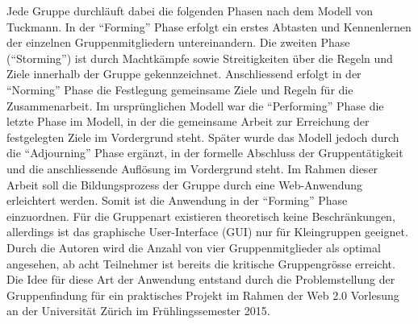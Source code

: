 \newline\newline
Jede Gruppe durchläuft dabei die folgenden Phasen nach dem Modell von Tuckmann.\citep[Vgl.][S.~26-28]{dick_teamwork_2013} In der "`Forming"' Phase erfolgt ein erstes Abtasten und Kennenlernen der einzelnen Gruppenmitgliedern untereinandern. Die zweiten Phase ("`Storming"') ist durch Machtkämpfe sowie Streitigkeiten über die Regeln und Ziele innerhalb der Gruppe gekennzeichnet. Anschliessend erfolgt in der "`Norming"' Phase die Festlegung gemeinsame Ziele und Regeln für die Zusammenarbeit. Im ursprünglichen Modell war die "`Performing"' Phase die letzte Phase im Modell, in der die gemeinsame Arbeit zur Erreichung der festgelegten Ziele im Vordergrund steht. Später wurde das Modell jedoch durch die "`Adjourning"' Phase ergänzt, in der formelle Abschluss der Gruppentätigkeit und die anschliessende Auflösung im Vordergrund steht.
\newline\newline
Im Rahmen dieser Arbeit soll die Bildungsprozess der Gruppe durch eine Web-Anwendung erleichtert werden. Somit ist die Anwendung in der "`Forming"' Phase einzuordnen. Für die Gruppenart existieren theoretisch keine Beschränkungen, allerdings ist das graphische User-Interface (GUI) nur für Kleingruppen geeignet. Durch die Autoren wird die Anzahl von vier Gruppenmitglieder als optimal angesehen, ab acht Teilnehmer ist bereits die kritische Gruppengrösse erreicht. Die Idee für diese Art der Anwendung entstand durch die Problemstellung der Gruppenfindung für ein praktisches Projekt im Rahmen der Web 2.0 Vorlesung an der Universität Zürich im Frühlingssemester 2015.
